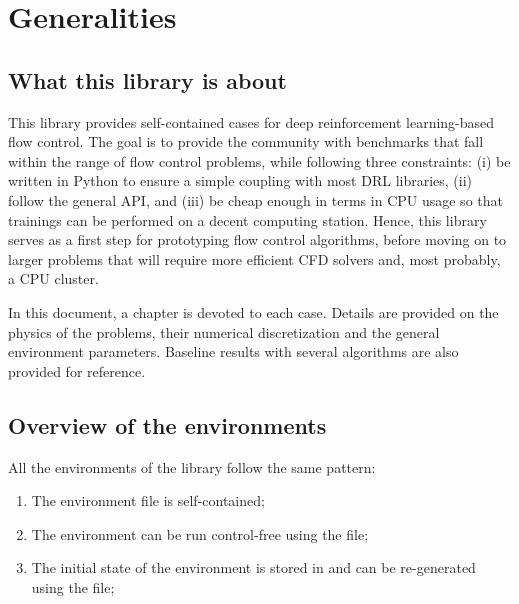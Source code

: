 \chapter{Generalities}

\section{What this library is about}

This library provides self-contained cases for deep reinforcement learning-based flow control. The goal is to provide the community with benchmarks that fall within the range of flow control problems, while following three constraints: (i) be written in Python to ensure a simple coupling with most DRL libraries, (ii) follow the general \gym API, and (iii) be cheap enough in terms in CPU usage so that trainings can be performed on a decent computing station. Hence, this library serves as a first step for prototyping flow control algorithms, before moving on to larger problems that will require more efficient CFD solvers and, most probably, a CPU cluster.

In this document, a chapter is devoted to each case. Details are provided on the physics of the problems, their numerical discretization and the general environment parameters. Baseline results with several algorithms are also provided for reference.

\section{Overview of the environments}

All the environments of the library follow the same pattern:

\begin{enumerate}[itemsep=0mm]
	\item The environment file is self-contained;
	\item The environment can be run control-free using the  file;
	\item The initial state of the environment is stored in  and can be re-generated using the  file;
\end{enumerate}

